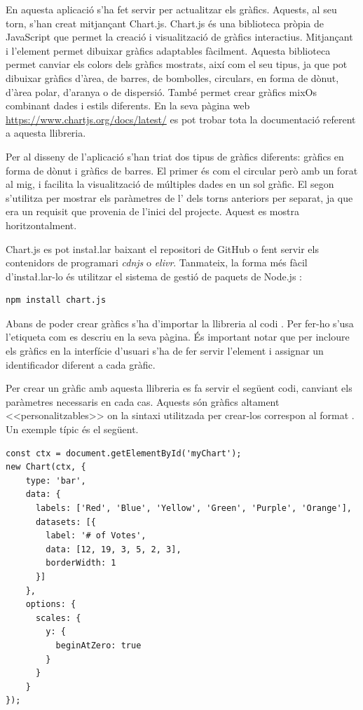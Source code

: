 \documentclass{tfgitic}[2022/06/30]
\begin{document}
En aquesta aplicació s'ha fet servir  per actualitzar els gràfics. Aquests, al seu torn, s'han creat mitjançant Chart.js. Chart.js és una biblioteca pròpia de JavaScript que permet la creació i visualització de gràfics interactius. Mitjançant  i l'element  permet dibuixar gràfics adaptables fàcilment. Aquesta biblioteca permet canviar els colors dels gràfics mostrats, així com el seu tipus, ja que pot dibuixar gràfics d'àrea, de barres, de bombolles, circulars, en forma de dònut, d'àrea polar, d'aranya o de dispersió. També permet crear gràfics mixOs combinant dades i estils diferents. En la seva pàgina web \url{https://www.chartjs.org/docs/latest/} es pot trobar tota la documentació referent a aquesta llibreria.

Per al disseny de l'aplicació s'han triat dos tipus de gràfics diferents: gràfics en forma de dònut i gràfics de barres. El primer és com el circular però amb un forat al mig, i facilita la visualització de múltiples dades en un sol gràfic. El segon s'utilitza per mostrar els paràmetres de l' dels torns anteriors per separat, ja que era un requisit que provenia de l'inici del projecte. Aquest es mostra horitzontalment.

Chart.js es pot insta\l.lar baixant el repositori de GitHub o fent servir els contenidors de programari \emph{cdnjs} o \emph{elivr}. Tanmateix, la forma més fàcil d'insta\l.lar-lo és utilitzar el sistema de gestió de paquets de Node.js :

\begin{lstlisting}[style = bash]
npm install chart.js 
\end{lstlisting}

Abans de poder crear gràfics s'ha d'importar la llibreria al codi . Per fer-ho s'usa l'etiqueta  com es descriu en la seva pàgina. És important notar que per incloure els gràfics en la interfície d'usuari s'ha de fer servir l'element  i assignar un identificador diferent a cada gràfic.

Per crear un gràfic amb aquesta llibreria es fa servir el següent codi, canviant els paràmetres necessaris en cada cas. Aquests són gràfics altament <<personalitzables>> on la sintaxi utilitzada per crear-los correspon al format . Un exemple típic és el següent.

\begin{lstlisting}[style = javascript]
 const ctx = document.getElementById('myChart');
new Chart(ctx, {
    type: 'bar',
    data: {
      labels: ['Red', 'Blue', 'Yellow', 'Green', 'Purple', 'Orange'],
      datasets: [{
        label: '# of Votes',
        data: [12, 19, 3, 5, 2, 3],
        borderWidth: 1
      }]
    },
    options: {
      scales: {
        y: {
          beginAtZero: true
        }
      }
    }
});
\end{lstlisting}
\end{document}
